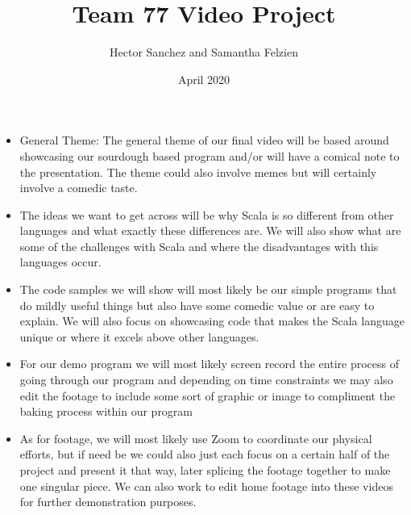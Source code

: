 \documentclass{article}
\title{Team 77 Video Project}
\author{Hector Sanchez and Samantha Felzien}
\date{April 2020}
\begin{document}
\maketitle


\begin{itemize}
    \item General Theme: The general theme of our final video will be based around showcasing our sourdough based program and/or will have a comical note to the presentation. The theme could also involve memes but will certainly involve a comedic taste.
    \item The ideas we want to get across will be why Scala is so different from other languages and what exactly these differences are. We will also show what are some of the challenges with Scala and where the disadvantages with this languages occur.
    \item The code samples we will show will most likely be our simple programs that do mildly useful things but also have some comedic value or are easy to explain. We will also focus on showcasing code that makes the Scala language unique or where it excels above other languages.
    \item For our demo program we will most likely screen record the entire process of going through our program and depending on time constraints we may also edit the footage to include some sort of graphic or image to compliment the baking process within our program
    \item As for footage, we will most likely use Zoom to coordinate our physical efforts, but if need be we could also just each focus on a certain half of the project and present it that way, later splicing the footage together to make one singular piece. We can also work to edit home footage into these videos for further demonstration purposes.
\end{itemize}
\end{document}
